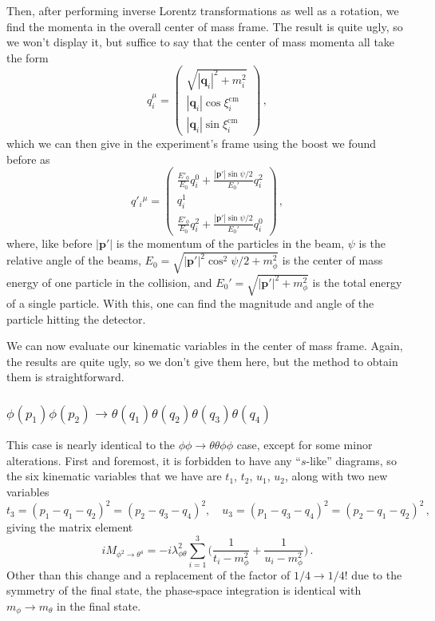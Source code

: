 \documentclass{article}
\numberwithin{equation}{subsection}
\begin{document}
Then, after performing inverse Lorentz transformations as well as a rotation, we find the momenta in the overall center of mass frame. The result is
quite ugly, so we won't display it, but suffice to say that the center of mass momenta all take the form
\begin{equation}
	q_i^\mu = \begin{pmatrix}
		\sqrt{|\mathbf{q}_i|^2 + m_i^2} \\
		|\mathbf{q}_i|\cos\xi_i^{\text{cm}} \\
		|\mathbf{q}_i|\sin\xi_i^{\text{cm}}
	\end{pmatrix}\,,
\end{equation}
which we can then give in the experiment's frame using the boost we found before as
\begin{equation}
	q'_i{}^\mu = \begin{pmatrix}
		\frac{E'_0}{E_0}q_i^0 +\frac{|\mathbf{p}'|\sin\psi/2}{E_0'}q_i^2 \\
		q_i^1 \\
		\frac{E'_0}{E_0}q_i^2 + \frac{|\mathbf{p}'|\sin\psi/2}{E_0'} q_i^0
	\end{pmatrix}\,,
\end{equation}
where, like before $|\mathbf{p}'|$ is the momentum of the particles in the beam, $\psi$ is the relative angle of the beams, $E_0 = \sqrt{|\mathbf{p}'|^2\cos^2\psi/2 + m_\phi^2}$
is the center of mass energy of one particle in the collision, and $E_0' = \sqrt{|\mathbf{p}'|^2 + m_\phi^2}$ is the total energy of a single particle. With this, one can find
the magnitude and angle of the particle hitting the detector.

We can now evaluate our kinematic variables in the center of mass frame. Again, the results are quite ugly, so we don't give them here, but the method to obtain them is
straightforward.

\subsubsection{$\phi(p_1)\phi(p_2)\to\theta(q_1)\theta(q_2)\theta(q_3)\theta(q_4)$}

This case is nearly identical to the $\phi\phi\to\theta\theta\phi\phi$ case, except for some minor alterations. First and foremost, it is forbidden to have any ``$s$-like'' diagrams,
so the six kinematic variables that we have are $t_1$, $t_2$, $u_1$, $u_2$, along with two new variables
\begin{equation}
	t_3 = (p_1 - q_1 - q_2)^2 = (p_2 - q_3 - q_4)^2, \quad u_3 = (p_1 - q_3 - q_4)^2 = (p_2 - q_1 - q_2)^2\,,
\end{equation}
giving the matrix element
\begin{equation}
	iM_{\phi^2\to\theta^4} = -i\lambda_{\phi\theta}^2\sum_{i=1}^3\Big(\frac{1}{t_i - m_\phi^2} + \frac{1}{u_i - m_\phi^2}\Big)\,.
\end{equation}
Other than this change and a replacement of the factor of $1/4 \to 1/4!$ due to the symmetry of the final state, 
the phase-space integration is identical with $m_\phi\to m_\theta$ in the final state.
\end{document}
